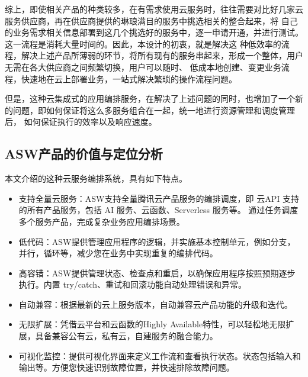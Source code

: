 %
%
%
%
%


综上，即使相关产品的种类较多，在有需求使用云服务时，往往需要对比好几家云服务供应商，再在供应商提供的琳琅满目的服务中挑选相关的整合起来，将
自己的业务需求相关信息部署到这几个挑选好的服务中，逐一申请开通，并进行测试。这一流程是消耗大量时间的。因此，本设计的初衷，就是解决这
种低效率的流程，解决上述产品所薄弱的环节，将所有现有的服务串起来，形成一个整体，用户无需在各大供应商之间频繁切换，用户可以随时、
低成本地创建、变更业务流程，快速地在云上部署业务，一站式解决繁琐的操作流程问题\cite{jydyyybp}。

但是，这种云集成式的应用编排服务，在解决了上述问题的同时，也增加了一个新的问题，即如何保证将这么多服务组合在一起，统一地进行资源管理和调度管理后，
如何保证执行的效率以及响应速度。

\subsection{ASW产品的价值与定位分析}
本文介绍的这种云服务编排系统，具有如下特点。

\begin{itemize}
    \item 支持全量云服务：ASW支持全量腾讯云产品服务的编排调度，即 云API 支持的所有产品服务，包括 AI 服务、云函数、Serverless 服务等。
    通过任务调度多个服务产品，完成复杂业务应用编排场景。
    \item 低代码：ASW提供管理应用程序的逻辑，并实施基本控制单元，例如分支，并行，循环等，减少您在业务中实现重复的编排代码。
    \item 高容错：ASW提供管理状态、检查点和重启，以确保应用程序按照预期逐步执行。内置 try/catch、重试和回滚功能自动处理错误和异常。
    \item 自动兼容：根据最新的云上服务版本，自动兼容云产品功能的升级和迭代。
    \item 无限扩展：凭借云平台和云函数的Highly Available特性，可以轻松地无限扩展，具备兼容公有云，私有云，自建服务的融合能力。
    \item 可视化监控：提供可视化界面来定义工作流和查看执行状态。状态包括输入和输出等。方便您快速识别故障位置，并快速排除故障问题。
\end{itemize}



